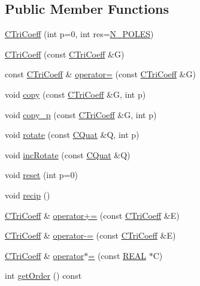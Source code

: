 \subsection*{Public Member Functions}
\begin{DoxyCompactItemize}
\item 
\hyperlink{classCTriCoeff_a00b825a596e5f4dd0184a50c53bd5d3c}{C\-Tri\-Coeff} (int p=0, int res=\hyperlink{mcoeff_8h_ac23f9c13c5d07d9ce386f7a830c35e5a}{N\-\_\-\-P\-O\-L\-E\-S})
\item 
\hyperlink{classCTriCoeff_ad086149d1a3911a29aeef3dd14ed4042}{C\-Tri\-Coeff} (const \hyperlink{classCTriCoeff}{C\-Tri\-Coeff} \&G)
\item 
const \hyperlink{classCTriCoeff}{C\-Tri\-Coeff} \& \hyperlink{classCTriCoeff_a303a152b75ea66fcd65f5377b317b4d1}{operator=} (const \hyperlink{classCTriCoeff}{C\-Tri\-Coeff} \&G)
\item 
void \hyperlink{classCTriCoeff_ae0b9dd50b8bef198ddd02ba8027d11a3}{copy} (const \hyperlink{classCTriCoeff}{C\-Tri\-Coeff} \&G, int p)
\item 
void \hyperlink{classCTriCoeff_a6568774c5e5a6fe066c739a718de1ba6}{copy\-\_\-p} (const \hyperlink{classCTriCoeff}{C\-Tri\-Coeff} \&G, int p)
\item 
void \hyperlink{classCTriCoeff_aa80c22419286d9fc99daafb90a44d03e}{rotate} (const \hyperlink{classCQuat}{C\-Quat} \&Q, int p)
\item 
void \hyperlink{classCTriCoeff_a2c13fdad1377155cfa7123f8bd04a634}{inc\-Rotate} (const \hyperlink{classCQuat}{C\-Quat} \&Q)
\item 
void \hyperlink{classCTriCoeff_ada2ca53b0a0e3f6b8c9667fd7984e610}{reset} (int p=0)
\item 
void \hyperlink{classCTriCoeff_a0cd79d07cd4eb27e673886611f94f3ab}{recip} ()
\item 
\hyperlink{classCTriCoeff}{C\-Tri\-Coeff} \& \hyperlink{classCTriCoeff_aef9fe1d38095a8764a1d65117c1ca10a}{operator+=} (const \hyperlink{classCTriCoeff}{C\-Tri\-Coeff} \&E)
\item 
\hyperlink{classCTriCoeff}{C\-Tri\-Coeff} \& \hyperlink{classCTriCoeff_a6b15143e57034f33f5e1a716d995ff95}{operator-\/=} (const \hyperlink{classCTriCoeff}{C\-Tri\-Coeff} \&E)
\item 
\hyperlink{classCTriCoeff}{C\-Tri\-Coeff} \& \hyperlink{classCTriCoeff_aec9e2fe8be849b6dfbcfd962c45c1695}{operator$\ast$=} (const \hyperlink{util_8h_a5821460e95a0800cf9f24c38915cbbde}{R\-E\-A\-L} $\ast$C)
\item 
int \hyperlink{classCTriCoeff_a0190ac9feab5bb2cb5e04ea48539b2fe}{get\-Order} () const 

\end{DoxyCompactItemize}
